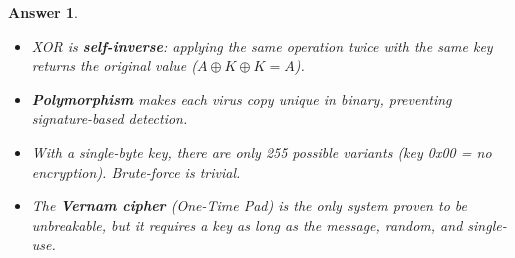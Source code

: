 \documentclass[a4paper,11pt]{article}
\theoremstyle{plain}
\newtheorem{correction}{Answer}
\theoremstyle{definition}
\begin{document}
\begin{correction}
\begin{enumerate}
\end{enumerate}

\begin{pointcle}
\begin{itemize}
    \item XOR is \textbf{self-inverse}: applying the same operation twice with the same key returns the original value ($A \oplus K \oplus K = A$).
    \item \textbf{Polymorphism} makes each virus copy unique in binary, preventing signature-based detection.
    \item With a single-byte key, there are only 255 possible variants (key 0x00 = no encryption). Brute-force is trivial.
    \item The \textbf{Vernam cipher} (One-Time Pad) is the only system proven to be unbreakable, but it requires a key as long as the message, random, and single-use.
\end{itemize}
\end{pointcle}

\end{correction}

\bigskip

\end{document}
